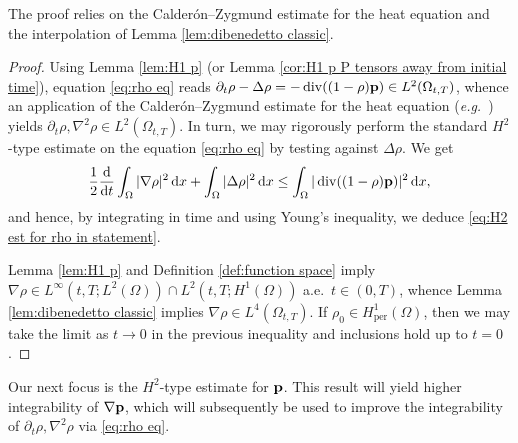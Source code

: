 \documentclass[11pt,a4paper,reqno]{amsart}
\theoremstyle{remark}
\theoremstyle{definition}
\numberwithin{equation}{section}
\newcommand{\per}{\mathrm{per}}
\DeclareMathOperator{\dv}{div}
\newcommand{\p}{{\bf p}}
\renewcommand{\d}{\, \mathrm{d} }
\newcommand{\der}{\mathrm{d}}
\begin{document}
The proof relies on the Calder\'on--Zygmund estimate for the heat equation and the interpolation  of Lemma \ref{lem:dibenedetto classic}. 



\begin{proof}
    Using Lemma \ref{lem:H1 p} (or Lemma \ref{cor:H1 p P tensors away from initial time}), equation \eqref{eq:rho eq} reads $\partial_t \rho - \Delta \rho = -\dv((1-\rho)\p) \in L^2(\Omega_{t,T})$, whence an application of the Calder\'on--Zygmund estimate for the heat equation (\textit{e.g.}~\cite[Theorem 3.1]{RosHeat}) yields $\partial_t \rho , \nabla^2 \rho \in L^2(\Omega_{t,T})$. In turn, we may rigorously perform the standard $H^2$-type estimate on the equation \eqref{eq:rho eq} by testing against $\Delta \rho$. We get 
    \begin{equation*}
        \frac{1}{2}\frac{\der}{\der t}\int_\Omega |\nabla \rho|^2 \d x + \int_\Omega |\Delta \rho|^2 \d x \leq \int_\Omega |\dv((1-\rho)\p)|^2 \d x, 
    \end{equation*}
    and hence, by integrating in time and using Young's inequality, we deduce \eqref{eq:H2 est for rho in statement}.
    
   Lemma \ref{lem:H1 p} and Definition \ref{def:function space} imply $\nabla \rho \in L^\infty(t,T;L^2(\Omega)) \cap L^2(t,T;H^1(\Omega))$ a.e.~$t \in (0,T)$, whence Lemma \ref{lem:dibenedetto classic} implies $\nabla \rho \in L^4(\Omega_{t,T})$. If $\rho_0 \in H^1_\per(\Omega)$, then we may take the limit as $t \to 0$ in the previous inequality and inclusions hold up to $t=0$. 
\end{proof}



Our next focus is the $H^2$-type estimate for $\p$. This result will yield higher integrability of $\nabla \p$, which will subsequently be used to improve the integrability of $\partial_t \rho, \nabla^2 \rho$ via \eqref{eq:rho eq}. 
\end{document}
